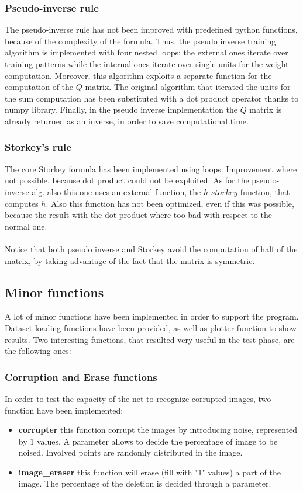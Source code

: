 \documentclass[letterpaper,twocolumn,10pt]{article}
\begin{document}
\subsubsection{Pseudo-inverse rule}
The pseudo-inverse rule has not been improved with predefined python functions, because of the complexity of the formula. Thus, the pseudo inverse training algorithm is implemented with four nested loops: the external ones iterate over training patterns while the internal ones iterate over single units for the weight computation. Moreover, this algorithm exploits a separate function for the computation of the $Q$ matrix. The original algorithm that iterated the units for the sum computation has been substituted with a dot product operator thanks to numpy library. Finally, in the pseudo inverse implementation the $Q$ matrix is already returned as an inverse, in order to save computational time. 

\subsubsection{Storkey's rule}
The core Storkey formula has been implemented using loops. Improvement where not possible, because dot product could not be exploited. As for the pseudo-inverse alg. also this one uses an external function, the $h\_storkey$ function, that computes $h$. Also this function has not been optimized, even if this was possible, because the result with the dot product where too bad with respect to the normal one.\\ \\
\noindent Notice that both pseudo inverse and Storkey avoid the computation of half of the matrix, by taking advantage of the fact that the matrix is symmetric.

\subsection{Minor functions}
A lot of minor functions have been implemented in order to support the program. Dataset loading functions have been provided, as well as plotter function to show results. Two interesting functions, that resulted very useful in the test phase, are the following ones:
\subsubsection{Corruption and Erase functions}
In order to test the capacity of the net to recognize corrupted images, two function have been implemented:
\begin{itemize}
\item\textbf{corrupter} this function corrupt the images by introducing noise, represented by $1$ values. A parameter allows to decide the percentage of image to be noised. Involved points are randomly distributed in the image.
\item\textbf{image\_eraser} this function will erase (fill with "1" values) a part of the image. The percentage of the deletion is decided through a parameter.
\end{itemize} 
\end{document}
